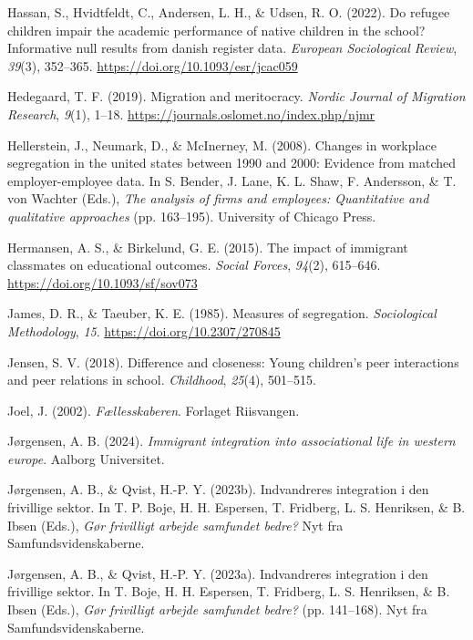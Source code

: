 \documentclass[
]{book}
\newlength{\cslhangindent}
\newenvironment{CSLReferences}[2] %
 {\begin{list}{}{%
  \setlength{\itemindent}{0pt}
  \setlength{\leftmargin}{0pt}
  \setlength{\parsep}{0pt}
  \ifodd #1
   \setlength{\leftmargin}{\cslhangindent}
   \setlength{\itemindent}{-1\cslhangindent}
  \fi
  \setlength{\itemsep}{#2\baselineskip}}}
 {\end{list}}
\begin{document}
\begin{CSLReferences}{1}{0}
Hassan, S., Hvidtfeldt, C., Andersen, L. H., \& Udsen, R. O. (2022). Do refugee children impair the academic performance of native children in the school? Informative null results from danish register data. \emph{European Sociological Review}, \emph{39}(3), 352--365. \url{https://doi.org/10.1093/esr/jcac059}

Hedegaard, T. F. (2019). Migration and meritocracy. \emph{Nordic Journal of Migration Research}, \emph{9}(1), 1--18. \url{https://journals.oslomet.no/index.php/njmr}

Hellerstein, J., Neumark, D., \& McInerney, M. (2008). Changes in workplace segregation in the united states between 1990 and 2000: Evidence from matched employer-employee data. In S. Bender, J. Lane, K. L. Shaw, F. Andersson, \& T. von Wachter (Eds.), \emph{The analysis of firms and employees: Quantitative and qualitative approaches} (pp. 163--195). University of Chicago Press.

Hermansen, A. S., \& Birkelund, G. E. (2015). The impact of immigrant classmates on educational outcomes. \emph{Social Forces}, \emph{94}(2), 615--646. \url{https://doi.org/10.1093/sf/sov073}

James, D. R., \& Taeuber, K. E. (1985). Measures of segregation. \emph{Sociological Methodology}, \emph{15}. \url{https://doi.org/10.2307/270845}

Jensen, S. V. (2018). Difference and closeness: Young children's peer interactions and peer relations in school. \emph{Childhood}, \emph{25}(4), 501--515.

Joel, J. (2002). \emph{Fællesskaberen}. Forlaget Riisvangen.

Jørgensen, A. B. (2024). \emph{Immigrant integration into associational life in western europe}. Aalborg Universitet.

Jørgensen, A. B., \& Qvist, H.-P. Y. (2023b). Indvandreres integration i den frivillige sektor. In T. P. Boje, H. H. Espersen, T. Fridberg, L. S. Henriksen, \& B. Ibsen (Eds.), \emph{Gør frivilligt arbejde samfundet bedre?} Nyt fra Samfundsvidenskaberne.

Jørgensen, A. B., \& Qvist, H.-P. Y. (2023a). Indvandreres integration i den frivillige sektor. In T. Boje, H. H. Espersen, T. Fridberg, L. S. Henriksen, \& B. Ibsen (Eds.), \emph{Gør frivilligt arbejde samfundet bedre?} (pp. 141--168). Nyt fra Samfundsvidenskaberne.


\end{CSLReferences}
\end{document}

